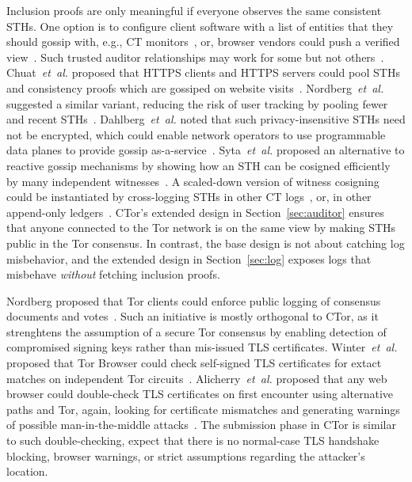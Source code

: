 Inclusion proofs are only meaningful if everyone observes the same consistent
STHs.
One option is to configure client software with a list of entities that they
should gossip with, e.g., CT monitors~\cite{chase}, or,
browser vendors could push a verified view~\cite{sth-push}.
Such trusted auditor relationships may work for some but not
others~\cite{nordberg}.
Chuat~\emph{et~al.} proposed that HTTPS clients and HTTPS servers could pool
STHs and consistency proofs which are gossiped on website visits~\cite{chuat}.
Nordberg~\emph{et~al.} suggested a similar variant, reducing the risk of user
tracking by pooling fewer and recent STHs~\cite{nordberg}.
Dahlberg~\emph{et~al.} noted that such privacy-insensitive STHs need not be
encrypted, which could enable network operators to use programmable data planes
to provide gossip as-a-service~\cite{dahlberg}.
Syta~\emph{et~al.} proposed an alternative to reactive gossip mechanisms by
showing how an STH can be cosigned efficiently by many independent
witnesses~\cite{syta}.
A scaled-down version of witness cosigning could be instantiated by
cross-logging STHs in other CT logs~\cite{minimal-gossip},
or, in other append-only ledgers~\cite{catena}.
CTor's extended design in Section~\ref{sec:auditor} ensures that anyone
connected to the Tor network is on the same view by making STHs public in the
Tor consensus.  In contrast, the base design is not about catching log
misbehavior, and the extended design in Section~\ref{sec:log} exposes logs
that misbehave \emph{without} fetching inclusion proofs.

Nordberg proposed that Tor clients could enforce public logging of consensus
documents and votes~\cite{consensus-transparency}.  Such an initiative is
mostly orthogonal to CTor, as it strenghtens the assumption of a secure Tor
consensus by enabling detection of compromised signing keys rather than
mis-issued TLS certificates.  Winter~\emph{et~al.} proposed that Tor Browser
could check self-signed TLS certificates for extact matches on independent Tor
circuits~\cite{spoiled-onions}.  Alicherry~\emph{et~al.} proposed that any web browser could
double-check TLS certificates on first encounter using alternative paths and
Tor, again, looking for certificate mismatches and generating warnings of
possible man-in-the-middle attacks~\cite{doublecheck}.  The submission phase in
CTor is similar to such double-checking, expect that there is no normal-case TLS
handshake blocking, browser warnings, or strict assumptions regarding the
attacker's location.
